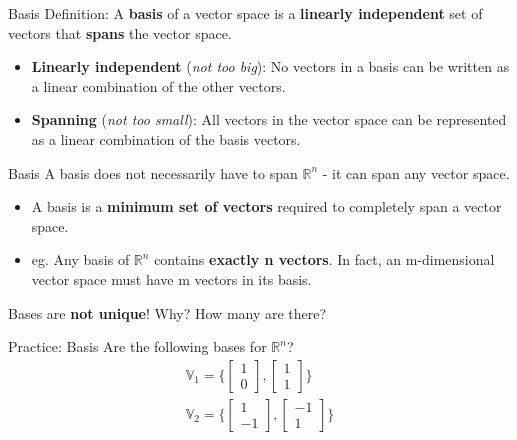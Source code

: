 \begin{frame}{Basis}
    Definition: A \textbf{basis} of a vector space is a \textbf{linearly independent} set of vectors that \textbf{spans} the vector space.
    \begin{itemize}
        \item \textbf{Linearly independent} (\textit{not too big}): No vectors in a basis can be written as a linear combination of the other vectors.
        \item \textbf{Spanning} (\textit{not too small}): All vectors in the vector space can be represented as a linear combination of the basis vectors.
    \end{itemize}
\end{frame}

\begin{frame}{Basis}
    A basis does not necessarily have to span $\mathbb{R}^n$ - it can span any vector space.
    \begin{itemize}
        \item A basis is a \textbf{minimum set of vectors} required to completely span a vector space.
        \item eg. Any basis of $\mathbb{R}^n$ contains \textbf{exactly n vectors}. In fact, an m-dimensional vector space must have m vectors in its basis.
    \end{itemize}
    Bases are \textbf{not unique}! Why? How many are there?
\end{frame}

\begin{frame}{Practice: Basis}
    Are the following bases for $\mathbb{R}^n$?
    \begin{align*}
        \mathbb{V}_1 = \bigg\{ \begin{bmatrix}
            1 \\ 0
        \end{bmatrix}, 
        \begin{bmatrix}
            1 \\ 1
        \end{bmatrix} \bigg\} \\[1ex]
        \mathbb{V}_2 = \bigg\{ \begin{bmatrix}
            1 \\ -1
        \end{bmatrix}, 
        \begin{bmatrix}
            -1 \\ 1
        \end{bmatrix} \bigg\}
    \end{align*}
\end{frame}

